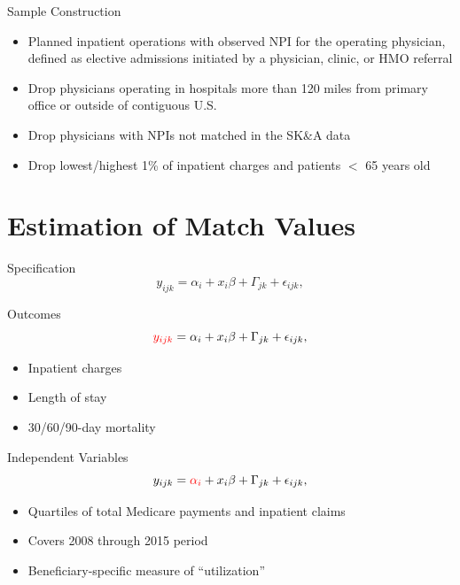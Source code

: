 \documentclass[t]{beamer}
\begin{document}
\begin{frame}{Sample Construction}
    \begin{itemize}
        \item<1-> Planned inpatient operations with observed NPI for the operating physician, defined as elective admissions initiated by a physician, clinic, or HMO referral
        \item<2-> Drop physicians operating in hospitals more than 120 miles from primary office or outside of contiguous U.S.
        \item<3-> Drop physicians with NPIs not matched in the SK\&A data
        \item<4-> Drop lowest/highest 1\% of inpatient charges and patients $<$ 65 years old
    \end{itemize}
\end{frame}



\section{Estimation of Match Values}
\begin{frame}{Specification}
    \begin{equation*}
        y_{ijk} = \alpha_{i} + x_{i}\beta + \Gamma_{jk} + \epsilon_{ijk},
    \end{equation*}
\end{frame}

\begin{frame}{Outcomes}
    \begin{equation*}
        \textcolor{red}{y_{ijk}} = \alpha_{i} + x_{i}\beta + \Gamma_{jk} + \epsilon_{ijk},
    \end{equation*}

    \begin{itemize}
        \item Inpatient charges
        \item Length of stay
        \item 30/60/90-day mortality
    \end{itemize}
\end{frame}


\begin{frame}{Independent Variables}
    \begin{equation*}
        y_{ijk} = \textcolor{red}{\alpha_{i}} + x_{i}\beta + \Gamma_{jk} + \epsilon_{ijk},
    \end{equation*}

    \begin{itemize}
        \item Quartiles of total Medicare payments and inpatient claims
        \item Covers 2008 through 2015 period
        \item Beneficiary-specific measure of ``utilization''
    \end{itemize}
\end{frame}
\end{document}
